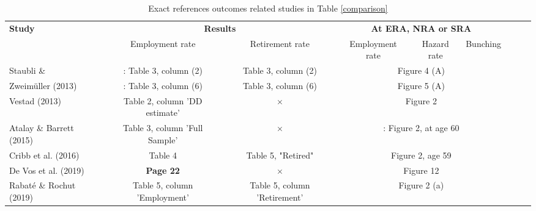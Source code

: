 \documentclass[12pt,a4paper]{article}
\begin{document}
\begin{sidewaystable}
	
		\footnotesize
		\caption{Exact references outcomes related studies in Table \ref{comparison}}
		\label{comparison_exact_references}
		\begin{tabular}{lccc cc ccc}		
		
			\toprule
			
			\textbf{Study} & \multicolumn{2}{c}{\textbf{Results}} &  \multicolumn{3}{c}{\textbf{At ERA, NRA or SRA}} \\	
			
			& Employment rate & Retirement rate & Employment rate & Hazard rate & Bunching \\
			\midrule
			
			Staubli \&  & 
			\male: Table 3, column (2) & Table 3, column (2) &
			\multicolumn{3}{c}{Figure 4 (A)} \\ 
			
			Zweimüller (2013) & \female: Table 3, column (6) & Table 3, column (6) &
			\multicolumn{3}{c}{Figure 5 (A)} \\ 
			
			Vestad (2013) & 
			Table 2, column 'DD estimate' & $\times$ &
			\multicolumn{3}{c}{Figure 2} \\ 
			
			Atalay \& Barrett (2015) & 
			Table 3, column 'Full Sample' & $\times$ &
			\multicolumn{3}{c}{\male: Figure 2, at age 60} \\ 

			Cribb et al. (2016) &
			Table 4 & Table 5, "Retired" &
			\multicolumn{3}{c}{Figure 2, age 59} \\ 

			De Vos et al. (2019) & 
			\textbf{Page 22} & $\times$ &  
			\multicolumn{3}{c}{Figure 12} \\

			Rabaté \& Rochut (2019) & 
			Table 5, column 'Employment' & Table 5, column 'Retirement' &  
			\multicolumn{3}{c}{Figure 2 (a)} \\


\end{tabular}
\end{sidewaystable}
\end{document}
